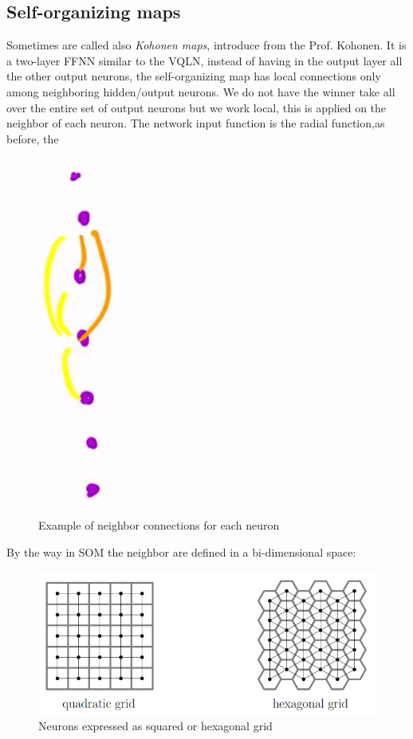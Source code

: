 \documentclass{article}
\begin{document}
\subsection{Self-organizing maps}
Sometimes are called also \textit{Kohonen maps}, introduce from the Prof. Kohonen. It is a two-layer
FFNN similar to the VQLN, instead of having in the output layer all the other output neurons, the
self-organizing map has local connections only among neighboring hidden/output neurons.
\newline\newline
We do not have the winner take all over the entire set of output neurons but we work local, this is applied
on the neighbor of each neuron. The network input function is the radial function,as before, the
\begin{figure}[H]
    \centering
    \includegraphics[scale=0.5]{images/som_examp.png}
    \caption{Example of neighbor connections for each neuron}
\end{figure}
By the way in SOM the neighbor are defined in a bi-dimensional space:
\begin{figure}[H]
    \centering
    \includegraphics[scale=0.6]{images/som_bi.png}
    \caption{Neurons expressed as squared or hexagonal grid}
\end{figure}
\end{document}
